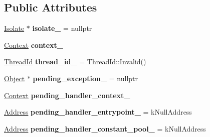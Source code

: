 \subsection*{Public Attributes}
\begin{DoxyCompactItemize}
\item 
\mbox{\label{classv8_1_1internal_1_1ThreadLocalTop_ad3bfe8ddc2775c1755add90fd9512b70}} 
\mbox{\hyperlink{classv8_1_1internal_1_1Isolate}{Isolate}} $\ast$ {\bfseries isolate\+\_\+} = nullptr
\item 
\mbox{\label{classv8_1_1internal_1_1ThreadLocalTop_a8410e5e540ebdbb435cbcb4c8fdd4cfb}} 
\mbox{\hyperlink{classv8_1_1internal_1_1Context}{Context}} {\bfseries context\+\_\+}
\item 
\mbox{\label{classv8_1_1internal_1_1ThreadLocalTop_a18b4279fc019aa2c8ce5c9f38d77aead}} 
\mbox{\hyperlink{classv8_1_1internal_1_1ThreadId}{Thread\+Id}} {\bfseries thread\+\_\+id\+\_\+} = Thread\+Id\+::\+Invalid()
\item 
\mbox{\label{classv8_1_1internal_1_1ThreadLocalTop_ad28eb89671a3e309634212aedede1ce3}} 
\mbox{\hyperlink{classv8_1_1internal_1_1Object}{Object}} $\ast$ {\bfseries pending\+\_\+exception\+\_\+} = nullptr
\item 
\mbox{\label{classv8_1_1internal_1_1ThreadLocalTop_adb2ba3e46ff286f2ce8dc60cd6d18b60}} 
\mbox{\hyperlink{classv8_1_1internal_1_1Context}{Context}} {\bfseries pending\+\_\+handler\+\_\+context\+\_\+}
\item 
\mbox{\label{classv8_1_1internal_1_1ThreadLocalTop_ad2da2e56e444b0e2af1325e2733907cc}} 
\mbox{\hyperlink{classuintptr__t}{Address}} {\bfseries pending\+\_\+handler\+\_\+entrypoint\+\_\+} = k\+Null\+Address
\item 
\mbox{\label{classv8_1_1internal_1_1ThreadLocalTop_ab9066c1f7881b8ab1552a598809eb4ec}} 
\mbox{\hyperlink{classuintptr__t}{Address}} {\bfseries pending\+\_\+handler\+\_\+constant\+\_\+pool\+\_\+} = k\+Null\+Address
\item 

\end{DoxyCompactItemize}
